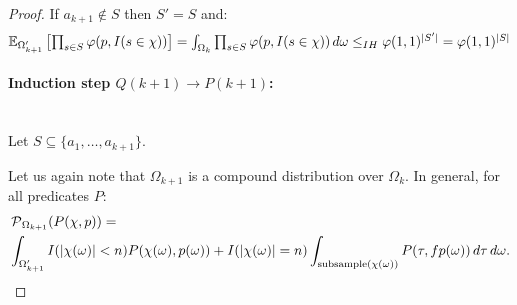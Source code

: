 \begin{proof}
If $a_{k+1} \notin S$ then $S' = S$ and:
\[
  \textstyle \operatorname{\mathbb E}_{\Omega'_{k+1}}\left[\prod_{s \in S} \varphi(p, I(s \in \chi)) \right] =
  \int_{\Omega_k} \prod_{s \in S} \varphi(p, I(s \in \chi)) \, d \omega \leq_{IH} \varphi(1,1)^{|S'|} =
  \varphi(1,1)^{|S|}
\]
\paragraph{Induction step $Q(k+1) \rightarrow P(k+1)$:} \phantom{.}\\
Let $S \subseteq \{ a_1, \ldots, a_{k+1} \}$.

Let us again note that $\Omega_{k+1}$ is a compound distribution over $\Omega_k$. In general, for 
all predicates $P$:
\begin{align*}
  & \operatorname{\mathcal P}_{\Omega_{k+1}}( P(\chi, p) ) = \\
  & \int_{\Omega'_{k+1}} I( |\chi(\omega)|<n ) P(\chi(\omega),p(\omega)) +
  I( |\chi(\omega)|=n ) \int_{\mathrm{subsample}(\chi(\omega))}
  P(\tau, f p(\omega)) \, d \tau \, d \omega \textrm{.}
\end{align*}


\end{proof}
